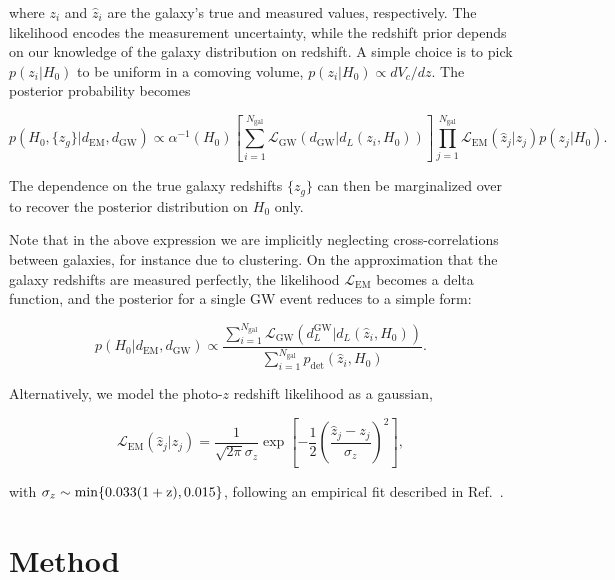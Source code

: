 \documentclass[%
preprint,
nofootinbib,
 amsmath,amssymb,
 aps,
]{revtex4-2}
\newcommand{\given}[2]{p( #1 | #2 )}
\newcommand{\pdet}[0]{p_{\text{det}}}
\begin{document}
where $z_i$ and $\hat{z}_i$ are the galaxy's true and measured values, respectively. The likelihood
encodes the measurement uncertainty, while the redshift prior depends on our knowledge of the
galaxy distribution on redshift. A simple choice is to pick $p(z_i | H_0)$ to be uniform in a
comoving volume, $p(z_i | H_0) \propto dV_c /dz$. The posterior probability becomes

\begin{equation}
	\label{eq:stat:full-redshift-posterior}
	\given{H_0, \{z_g\}}{d_\text{EM}, d_\text{GW}} \propto
	\alpha^{-1}(H_0) \left [ \sum_{i=1}^{N_\text{gal}} \mathcal{L}_\text{GW}(d_\text{GW} | d_L(z_i, H_0)) \right ]
	\prod_{j=1}^{N_\text{gal}} \mathcal{L}_\text{EM}(\hat{z}_j | z_j)p(z_j | H_0).
\end{equation}

The dependence on the true galaxy redshifts $\{z_g\}$ can then be marginalized over to recover the
posterior distribution on $H_0$ only.

Note that in the above expression we are implicitly neglecting cross-correlations between galaxies,
for instance due to clustering. On the approximation that the galaxy redshifts are measured
perfectly, the likelihood $\mathcal{L}_\text{EM}$ becomes a delta function, and the posterior for a
single GW event reduces to a simple form:

\begin{equation}
	\label{eq:stat:perfect-redshift-posterior}
	\given{H_0}{d_\text{EM}, d_\text{GW}} \propto
	\frac{\sum_{i=1}^{N_\text{gal}} \mathcal{L}_\text{GW}(d^\text{GW}_L | d_L(\hat{z}_i, H_0))}{\sum_{i=1}^{N_\text{gal}} \pdet(\hat{z}_i, H_0)}.
\end{equation}

Alternatively, we model the photo-$z$ redshift likelihood as a gaussian,

\begin{equation}
	\label{eq:stat:photo-z-likelihood}
	\mathcal{L}_\text{EM}(\hat{z}_j | z_j) = \frac{1}{\sqrt{2 \pi} \sigma_z} \exp{\left [-\frac{1}{2} \left (\frac{\hat{z}_j - z_j}{\sigma_z} \right )^2 \right ]},
\end{equation}

with $\sigma_z \sim \rm{min}\{0.033(1+z), 0.015\}$, following an empirical fit described in
Ref.~.

\section{Method}
\label{sec:method}
\end{document}
